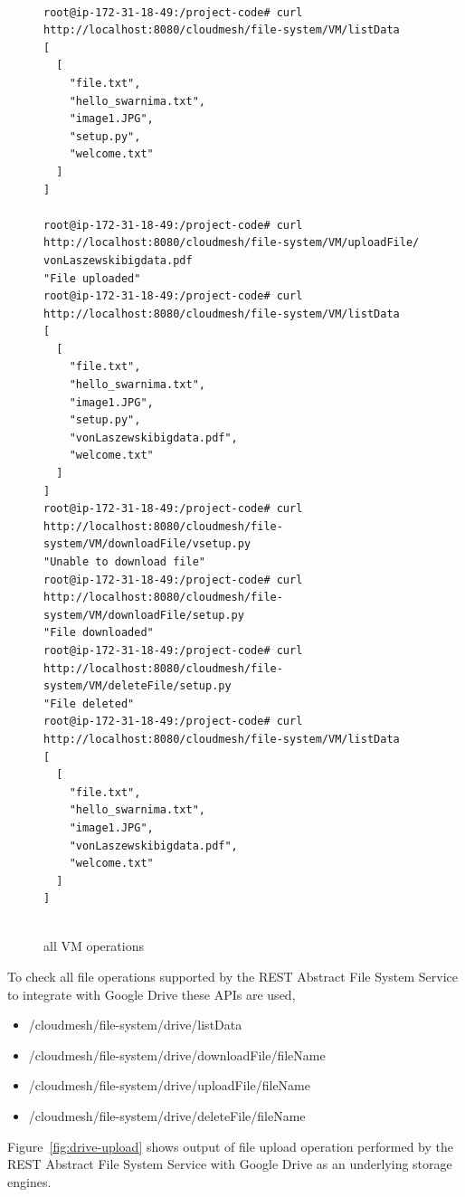 \begin{figure}[!ht]
\begin{footnotesize}
\begin{verbatim}

root@ip-172-31-18-49:/project-code# curl 
http://localhost:8080/cloudmesh/file-system/VM/listData
[
  [
    "file.txt",
    "hello_swarnima.txt",
    "image1.JPG",
    "setup.py",
    "welcome.txt"
  ]
]

root@ip-172-31-18-49:/project-code# curl 
http://localhost:8080/cloudmesh/file-system/VM/uploadFile/
vonLaszewskibigdata.pdf
"File uploaded"
root@ip-172-31-18-49:/project-code# curl 
http://localhost:8080/cloudmesh/file-system/VM/listData                    
[
  [
    "file.txt",
    "hello_swarnima.txt",
    "image1.JPG",
    "setup.py",
    "vonLaszewskibigdata.pdf",
    "welcome.txt"
  ]
]
root@ip-172-31-18-49:/project-code# curl 
http://localhost:8080/cloudmesh/file-system/VM/downloadFile/vsetup.py
"Unable to download file"
root@ip-172-31-18-49:/project-code# curl 
http://localhost:8080/cloudmesh/file-system/VM/downloadFile/setup.py
"File downloaded"
root@ip-172-31-18-49:/project-code# curl 
http://localhost:8080/cloudmesh/file-system/VM/deleteFile/setup.py
"File deleted"
root@ip-172-31-18-49:/project-code# curl 
http://localhost:8080/cloudmesh/file-system/VM/listData
[
  [
    "file.txt",
    "hello_swarnima.txt",
    "image1.JPG",
    "vonLaszewskibigdata.pdf",
    "welcome.txt"
  ]
]


\end{verbatim}
\end{footnotesize}
\caption{all VM operations}\label{fig:VM}
\end{figure}


To check all file operations supported by the REST Abstract File
System Service to integrate with Google Drive these APIs are used,

\begin{itemize}

    \item /cloudmesh/file-system/drive/listData
    \item /cloudmesh/file-system/drive/downloadFile/{fileName}
    \item /cloudmesh/file-system/drive/uploadFile/{fileName}
    \item /cloudmesh/file-system/drive/deleteFile/{fileName}

\end{itemize}

Figure~\ref{fig:drive-upload} shows output of file upload operation
performed by the REST Abstract File System Service with Google Drive
as an underlying storage engines.


